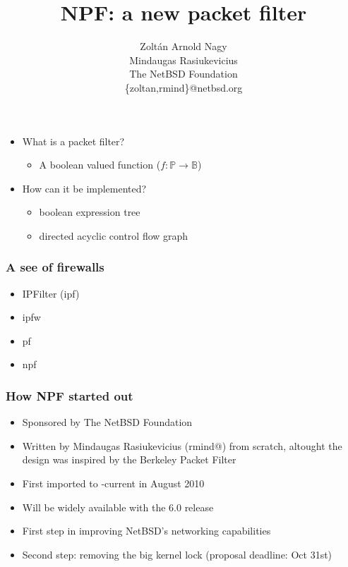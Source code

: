 \documentclass[magyar]{beamer}
\date{}
\begin{document}
\title{NPF: a new packet filter}
\author{Zoltán Arnold Nagy\\ Mindaugas Rasiukevicius \\ The NetBSD Foundation \\ \{zoltan,rmind\}@netbsd.org}
\maketitle

\begin{frame}
\begin{itemize}
	\item What is a packet filter?
\pause
	\begin{itemize}
		\item A boolean valued function ($f:\mathbb{P} \rightarrow \mathbb{B}$)
	\end{itemize}
\pause
	\item How can it be implemented?
\pause
	\begin{itemize}
		\item boolean expression tree
		\item directed acyclic control flow graph
	\end{itemize}
\end{itemize}
\end{frame}

\begin{frame}
\frametitle{A see of firewalls}
\begin{itemize}
	\item IPFilter (ipf)
	\item ipfw
	\item pf
	\item npf
\end{itemize}
\end{frame}

\begin{frame}
\frametitle{How NPF started out}
\begin{itemize}
	\item Sponsored by The NetBSD Foundation
	\item Written by Mindaugas Rasiukevicius (rmind@) from scratch, altought the design was inspired by the Berkeley Packet Filter
	\item First imported to -current in August 2010
	\item Will be widely available with the 6.0 release
	\item First step in improving NetBSD's networking capabilities
	\item Second step: removing the big kernel lock (proposal deadline: Oct 31st)
\end{itemize}
\end{frame}
\end{document}
